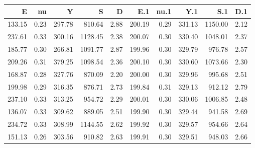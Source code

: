\begin{tabular}{rrrrrrrrrr}
\toprule
E & nu & Y & S & D & E.1 & nu.1 & Y.1 & S.1 & D.1 \\
\midrule
133.15 & 0.23 & 297.78 & 810.64 & 2.88 & 200.19 & 0.29 & 331.13 & 1150.00 & 2.12 \\
237.61 & 0.33 & 300.16 & 1128.45 & 2.38 & 200.07 & 0.30 & 330.40 & 1048.01 & 2.37 \\
185.77 & 0.30 & 266.81 & 1091.77 & 2.87 & 199.96 & 0.30 & 329.79 & 976.78 & 2.57 \\
209.26 & 0.31 & 379.25 & 1098.54 & 2.36 & 200.10 & 0.30 & 330.60 & 1073.66 & 2.30 \\
168.87 & 0.28 & 327.76 & 870.09 & 2.20 & 200.00 & 0.30 & 329.96 & 995.68 & 2.51 \\
199.98 & 0.29 & 316.35 & 876.71 & 2.73 & 199.84 & 0.31 & 329.13 & 912.12 & 2.79 \\
237.10 & 0.33 & 313.25 & 954.72 & 2.29 & 200.01 & 0.30 & 330.06 & 1006.85 & 2.48 \\
136.07 & 0.33 & 309.62 & 889.05 & 2.51 & 199.90 & 0.30 & 329.44 & 941.58 & 2.69 \\
234.72 & 0.33 & 308.99 & 1144.55 & 2.62 & 199.92 & 0.30 & 329.57 & 954.66 & 2.64 \\
151.13 & 0.26 & 303.56 & 910.82 & 2.63 & 199.91 & 0.30 & 329.51 & 948.03 & 2.66 \\
\bottomrule
\end{tabular}
